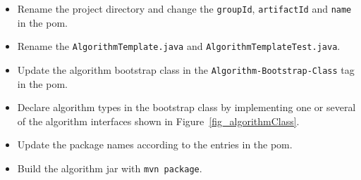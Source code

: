 \documentclass[10pt,a4paper]{article}
\begin{document}
\begin{itemize}
\item Rename the project directory and change the \texttt{groupId}, \texttt{artifactId} and \texttt{name} in the pom.
\item Rename the \texttt{AlgorithmTemplate.java} and \texttt{AlgorithmTemplateTest.java}.
\item Update the algorithm bootstrap class in the \texttt{Algorithm-Bootstrap-Class} tag in the pom.
\item Declare algorithm types in the bootstrap class by implementing one or several of the algorithm interfaces shown in Figure~\ref{fig_algorithmClass}. 
\item Update the package names according to the entries in the pom.
\item Build the algorithm jar with \texttt{mvn package}.
\end{itemize}
\end{document}
